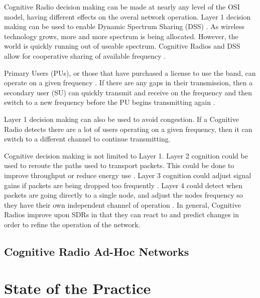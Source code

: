 Cognitive Radio decision making can be made at nearly any level of the OSI model, having different effects on the overal network operation. Layer 1 decision making can be used to enable Dynamic Spectrum Sharing (DSS) \cite{5771952}. As wireless technology grows, more and more spectrum is being allocated. However, the world is quickly running out of useable spectrum. Cognitive Radios and DSS allow for cooperative sharing of available frequency \cite{5771952}. 

Primary Users (PUs), or those that have purchased a license to use the band, can operate on a given frequency \cite{4562561}. If there are any gaps in their transmission, then a secondary user (SU) can quickly transmit and receive on the frequency and then switch to a new frequency before the PU begins transmitting again \cite{4562561}. 

Layer 1 decision making can also be used to avoid congestion. If a Cognitive Radio detects there are a lot of users operating on a given frequency, then it can switch to a different channel to continue transmitting.\cite{Akyildiz2007921} 

Cognitive decision making is not limited to Layer 1. Layer 2 cognition could be used to reroute the paths used to transport packets. This could be done to improve throughput or reduce energy use \cite{6527405}. Layer 3 cognition could adjust signal gains if packets are being dropped too frequently \cite{6072038}. Layer 4 could detect when packets are going directly to a single node, and adjust the nodes frequency so they have their own independent channel of operation \cite{5062176}. In general, Cognitive Radios improve upon SDRs in that they can react to and predict changes in order to refine the operation of the network. 

\subsection{Cognitive Radio Ad-Hoc Networks}

  

\section{State of the Practice}

